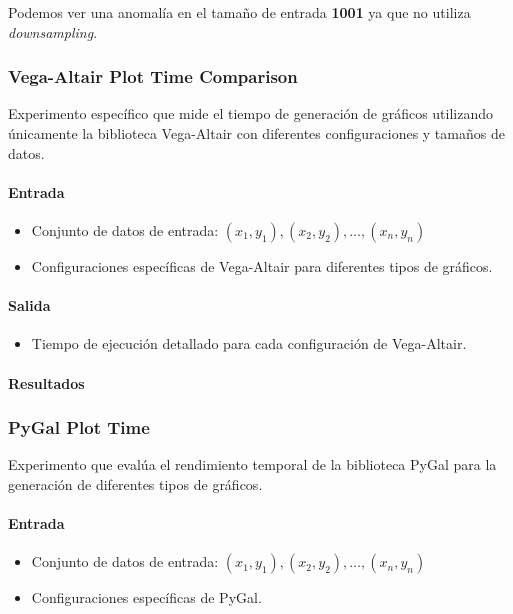 \AllLibrariesTimeComparison
\newpage

Podemos ver una anomalía en el tamaño de entrada \textbf{1001} ya que no utiliza \textit{downsampling}.

\subsubsection{Vega-Altair Plot Time Comparison}
\label{vega_altair_plot_time}

Experimento específico que mide el tiempo de generación de gráficos utilizando únicamente la biblioteca Vega-Altair con diferentes configuraciones y tamaños de datos.

\paragraph{Entrada}
\begin{itemize}
    \item Conjunto de datos de entrada: \( (x_1, y_1), (x_2, y_2), \ldots, (x_n, y_n) \)
    \item Configuraciones específicas de Vega-Altair para diferentes tipos de gráficos.
\end{itemize}

\paragraph{Salida}
\begin{itemize}
    \item Tiempo de ejecución detallado para cada configuración de Vega-Altair.
\end{itemize}

\paragraph{Resultados}
\vspace{0.5em}
\noindent

\VegaAltairPlotTimeComparison
\newpage

\subsubsection{PyGal Plot Time}
\label{pygal_plot_time}

Experimento que evalúa el rendimiento temporal de la biblioteca PyGal para la generación de diferentes tipos de gráficos.

\paragraph{Entrada}
\begin{itemize}
    \item Conjunto de datos de entrada: \( (x_1, y_1), (x_2, y_2), \ldots, (x_n, y_n) \)
    \item Configuraciones específicas de PyGal.
\end{itemize}

